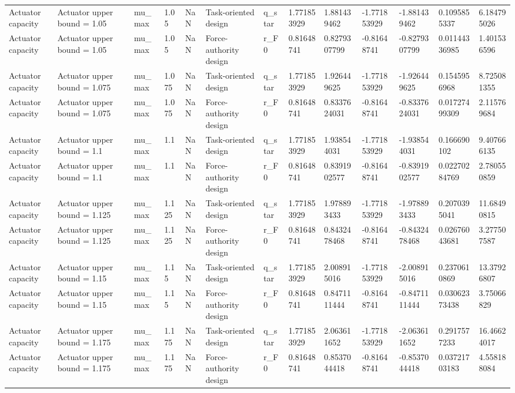 \begin{tabular}{@{}lllllllllllll@{}}
Actuator capacity & Actuator upper bound = 1.05 & mu\_max & 1.05 & NaN & Task-oriented design & q\_star & 1.771853929 & 1.881439462 & -1.771853929 & -1.881439462 & 0.1095855337 & 6.184795026 \\
Actuator capacity & Actuator upper bound = 1.05 & mu\_max & 1.05 & NaN & Force-authority design & r\_F0 & 0.81648741 & 0.8279307799 & -0.81648741 & -0.8279307799 & 0.01144336985 & 1.401536596 \\
Actuator capacity & Actuator upper bound = 1.075 & mu\_max & 1.075 & NaN & Task-oriented design & q\_star & 1.771853929 & 1.926449625 & -1.771853929 & -1.926449625 & 0.1545956968 & 8.725081355 \\
Actuator capacity & Actuator upper bound = 1.075 & mu\_max & 1.075 & NaN & Force-authority design & r\_F0 & 0.81648741 & 0.8337624031 & -0.81648741 & -0.8337624031 & 0.01727499309 & 2.115769684 \\
Actuator capacity & Actuator upper bound = 1.1 & mu\_max & 1.1 & NaN & Task-oriented design & q\_star & 1.771853929 & 1.938544031 & -1.771853929 & -1.938544031 & 0.166690102 & 9.407666135 \\
Actuator capacity & Actuator upper bound = 1.1 & mu\_max & 1.1 & NaN & Force-authority design & r\_F0 & 0.81648741 & 0.8391902577 & -0.81648741 & -0.8391902577 & 0.02270284769 & 2.780550859 \\
Actuator capacity & Actuator upper bound = 1.125 & mu\_max & 1.125 & NaN & Task-oriented design & q\_star & 1.771853929 & 1.978893433 & -1.771853929 & -1.978893433 & 0.2070395041 & 11.68490815 \\
Actuator capacity & Actuator upper bound = 1.125 & mu\_max & 1.125 & NaN & Force-authority design & r\_F0 & 0.81648741 & 0.8432478468 & -0.81648741 & -0.8432478468 & 0.02676043681 & 3.277507587 \\
Actuator capacity & Actuator upper bound = 1.15 & mu\_max & 1.15 & NaN & Task-oriented design & q\_star & 1.771853929 & 2.008915016 & -1.771853929 & -2.008915016 & 0.2370610869 & 13.37926807 \\
Actuator capacity & Actuator upper bound = 1.15 & mu\_max & 1.15 & NaN & Force-authority design & r\_F0 & 0.81648741 & 0.8471111444 & -0.81648741 & -0.8471111444 & 0.03062373438 & 3.75066829 \\
Actuator capacity & Actuator upper bound = 1.175 & mu\_max & 1.175 & NaN & Task-oriented design & q\_star & 1.771853929 & 2.063611652 & -1.771853929 & -2.063611652 & 0.2917577233 & 16.46624017 \\
Actuator capacity & Actuator upper bound = 1.175 & mu\_max & 1.175 & NaN & Force-authority design & r\_F0 & 0.81648741 & 0.8537044418 & -0.81648741 & -0.8537044418 & 0.03721703183 & 4.558188084 \\

\end{tabular}
